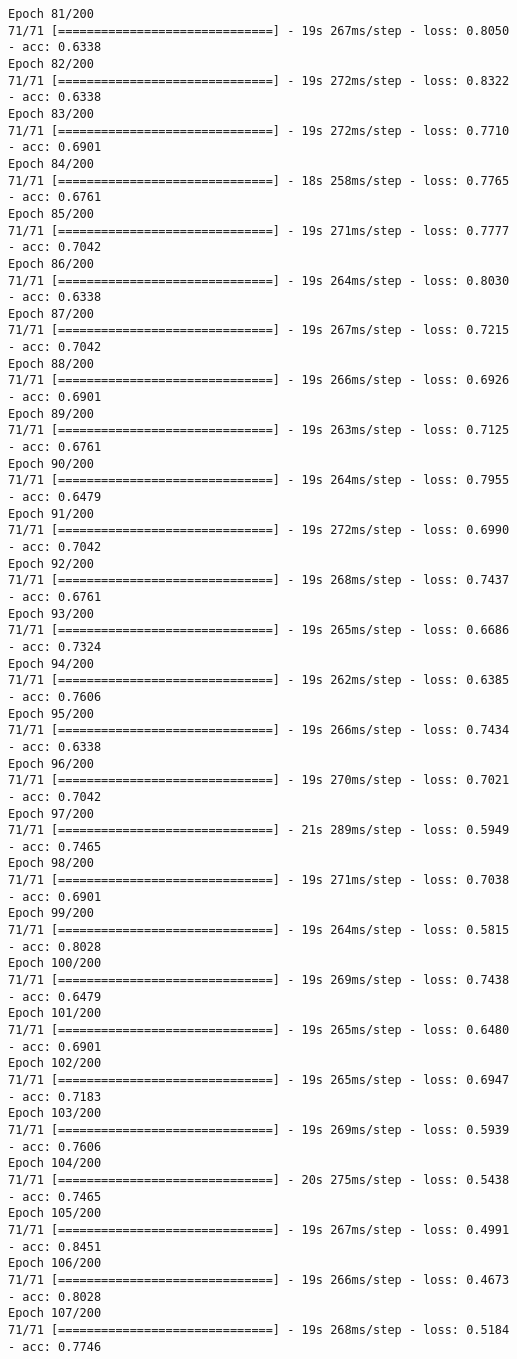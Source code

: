 \documentclass[11pt]{article}
\begin{document}
\begin{Verbatim}[commandchars=\\\{\}]
Epoch 81/200
71/71 [==============================] - 19s 267ms/step - loss: 0.8050 - acc: 0.6338
Epoch 82/200
71/71 [==============================] - 19s 272ms/step - loss: 0.8322 - acc: 0.6338
Epoch 83/200
71/71 [==============================] - 19s 272ms/step - loss: 0.7710 - acc: 0.6901
Epoch 84/200
71/71 [==============================] - 18s 258ms/step - loss: 0.7765 - acc: 0.6761
Epoch 85/200
71/71 [==============================] - 19s 271ms/step - loss: 0.7777 - acc: 0.7042
Epoch 86/200
71/71 [==============================] - 19s 264ms/step - loss: 0.8030 - acc: 0.6338
Epoch 87/200
71/71 [==============================] - 19s 267ms/step - loss: 0.7215 - acc: 0.7042
Epoch 88/200
71/71 [==============================] - 19s 266ms/step - loss: 0.6926 - acc: 0.6901
Epoch 89/200
71/71 [==============================] - 19s 263ms/step - loss: 0.7125 - acc: 0.6761
Epoch 90/200
71/71 [==============================] - 19s 264ms/step - loss: 0.7955 - acc: 0.6479
Epoch 91/200
71/71 [==============================] - 19s 272ms/step - loss: 0.6990 - acc: 0.7042
Epoch 92/200
71/71 [==============================] - 19s 268ms/step - loss: 0.7437 - acc: 0.6761
Epoch 93/200
71/71 [==============================] - 19s 265ms/step - loss: 0.6686 - acc: 0.7324
Epoch 94/200
71/71 [==============================] - 19s 262ms/step - loss: 0.6385 - acc: 0.7606
Epoch 95/200
71/71 [==============================] - 19s 266ms/step - loss: 0.7434 - acc: 0.6338
Epoch 96/200
71/71 [==============================] - 19s 270ms/step - loss: 0.7021 - acc: 0.7042
Epoch 97/200
71/71 [==============================] - 21s 289ms/step - loss: 0.5949 - acc: 0.7465
Epoch 98/200
71/71 [==============================] - 19s 271ms/step - loss: 0.7038 - acc: 0.6901
Epoch 99/200
71/71 [==============================] - 19s 264ms/step - loss: 0.5815 - acc: 0.8028
Epoch 100/200
71/71 [==============================] - 19s 269ms/step - loss: 0.7438 - acc: 0.6479
Epoch 101/200
71/71 [==============================] - 19s 265ms/step - loss: 0.6480 - acc: 0.6901
Epoch 102/200
71/71 [==============================] - 19s 265ms/step - loss: 0.6947 - acc: 0.7183
Epoch 103/200
71/71 [==============================] - 19s 269ms/step - loss: 0.5939 - acc: 0.7606
Epoch 104/200
71/71 [==============================] - 20s 275ms/step - loss: 0.5438 - acc: 0.7465
Epoch 105/200
71/71 [==============================] - 19s 267ms/step - loss: 0.4991 - acc: 0.8451
Epoch 106/200
71/71 [==============================] - 19s 266ms/step - loss: 0.4673 - acc: 0.8028
Epoch 107/200
71/71 [==============================] - 19s 268ms/step - loss: 0.5184 - acc: 0.7746

\end{Verbatim}
\end{document}
